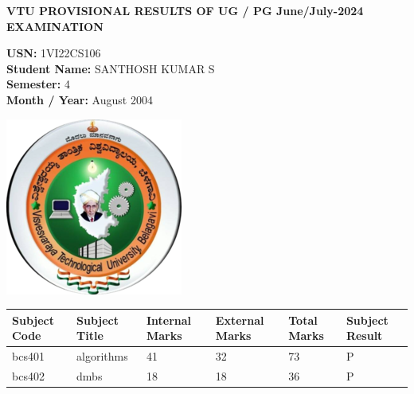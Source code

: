 \documentclass[a4paper,12pt]{article}
\begin{document}
\begin{center}
    \textbf{VTU PROVISIONAL RESULTS OF UG / PG June/July-2024 EXAMINATION}
\end{center}

\vspace{0.5cm}
\noindent
\begin{minipage}{0.7\textwidth}
\textbf{USN:} 1VI22CS106 \\
\textbf{Student Name:} SANTHOSH KUMAR S\\
\textbf{Semester: } 4\\
\textbf{Month / Year: } August 2004
\end{minipage}
\begin{minipage}{0.2\textwidth}
    \includegraphics[width=\textwidth]{vtulogo.png}
\end{minipage}
\vspace{0.5cm}

\begin{center}
\begin{tabular}{|m{2cm}|m{7cm}|m{2cm}|m{2cm}|m{2cm}|m{2cm}|}
    \hline
    \textbf{Subject Code} & \textbf{Subject Title} & \textbf{Internal Marks} & \textbf{External Marks} & \textbf{Total Marks} & \textbf{Subject Result} \\
    \hline
    bcs401 & algorithms & 41 & 32 & 73 & P \\ \hline
    bcs402 & dmbs & 18 & 18 & 36 & P \\ \hline
    \end{tabular}
\end{center}
\end{document}
